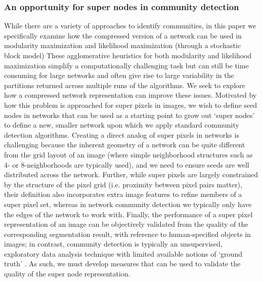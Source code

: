 \subsubsection{An opportunity for super nodes in community detection}
While there are a variety of approaches to identify communities, in this paper we specifically examine how the compressed version of a network can be used in modularity maximization and likelihood maximization (through a stochastic block model)
 These agglomerative heuristics for both modularity and likelihood maximization simplify a computationally challenging task but can still be time consuming for large networks and often give rise to large variability in the partitions returned across multiple runs of the algorithms. We seek to explore how a compressed network representation can improve these issues. Motivated by how this problem is approached for super pixels in images, we wish to define seed nodes in networks that can be used as a starting point to grow out `super nodes' to define a new, smaller network upon which we apply standard community detection algorithms. Creating a direct analog of super pixels in networks is challenging because the inherent geometry of a network can be quite different from the grid layout of an image (where simple neighborhood structures such as 4- or 8-neighborhoods are typically used), and we need to ensure seeds are well distributed across the network. Further, while super pixels are largely constrained by the structure of the pixel grid (i.e. proximity between pixel pairs matter), their definition also incorporates extra image features to refine members of a super pixel set, whereas in network community detection we typically only have the edges of the network to work with. Finally, the performance of a super pixel representation of an image can be objectively validated from the quality of the corresponding segmentation result, with reference to human-specified objects in images; in contrast, community detection is typically an unsupervised, exploratory data analysis technique with limited available notions of `ground truth' \cite{jureTruth}. As such, we must develop measures that can be used to validate the quality of the super node representation.
 
